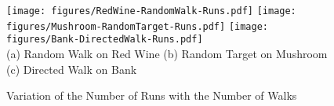 \documentclass[preprint,1p,authoryear,times]{elsarticle}
\begin{document}
\begin{figure}[h]
	\centering
	\texttt{[image: figures/RedWine-RandomWalk-Runs.pdf]}
	\texttt{[image: figures/Mushroom-RandomTarget-Runs.pdf]}
	\texttt{[image: figures/Bank-DirectedWalk-Runs.pdf]}\\
\scriptsize {(a) Random Walk on Red Wine \hspace{0.8cm} (b) Random Target on Mushroom \hspace{0.7cm} 
(c) Directed Walk on Bank} 
	\caption{Variation of the Number of Runs with the Number of Walks}
	\label{fig:CaseStudy-Runs}
\end{figure}	
\end{document}
